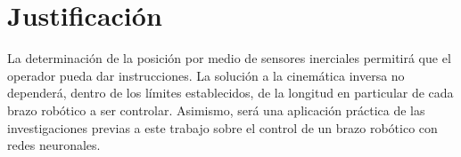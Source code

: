 \section{Justificación}

La determinación de la posición por medio de sensores inerciales permitirá que el operador pueda dar instrucciones. La solución a la cinemática inversa no dependerá, dentro de los límites establecidos, de la longitud en particular de cada brazo robótico a ser controlar. Asimismo, será una aplicación práctica de las investigaciones previas a este trabajo sobre el control de un brazo robótico con redes neuronales.